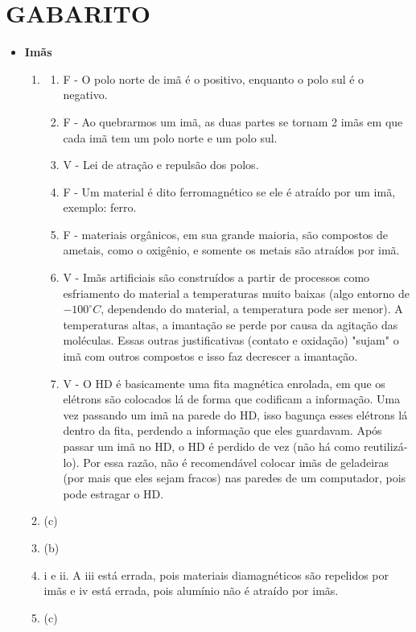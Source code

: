 \documentclass[12pt,letterpaper,fleqn]{article}
\begin{document}
    \section*{GABARITO}
    \begin{itemize}
        \item \textbf{Imãs}
    \begin{enumerate}
        \item
        \begin{enumerate}
            \item F - O polo norte de imã é o positivo, enquanto o polo sul é o negativo.
            \item F - Ao quebrarmos um imã, as duas partes se tornam 2 imãs em que cada imã tem um polo norte e um polo sul.
            \item V - Lei de atração e repulsão dos polos.
            \item F - Um material é dito ferromagnético se ele é atraído por um imã, exemplo: ferro.
            \item F - materiais orgânicos, em sua grande maioria, são compostos de ametais, como o oxigênio, e somente os metais são atraídos por imã.
            \item V - Imãs artificiais são construídos a partir de processos como esfriamento do material a temperaturas muito baixas (algo entorno de $-100^{\circ}C$, dependendo do material, a temperatura pode ser menor). A temperaturas altas, a imantação se perde por causa da agitação das moléculas. Essas outras justificativas (contato e oxidação) "sujam" o imã com outros compostos e isso faz decrescer a imantação.
            \item V - O HD é basicamente uma fita magnética enrolada, em que os elétrons são colocados lá de forma que codificam a informação. Uma vez passando um imã na parede do HD, isso bagunça esses elétrons lá dentro da fita, perdendo a informação que eles guardavam. Após passar um imã no HD, o HD é perdido de vez (não há como reutilizá-lo). Por essa razão, não é recomendável colocar imãs de geladeiras (por mais que eles sejam fracos) nas paredes de um computador, pois pode estragar o HD.
        \end{enumerate}
        \item (c)
        \item (b)
        \item i e ii. A iii está errada, pois materiais diamagnéticos são repelidos por imãs e iv está errada, pois alumínio não é atraído por imãs.
        \item (c)
    \end{enumerate}
   \end{itemize}
\end{document}
